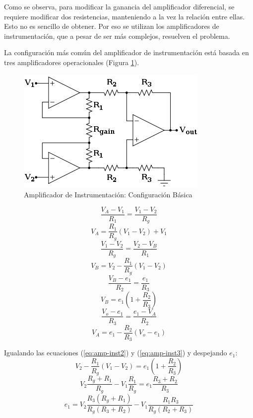 Como se observa, para modificar la ganancia del amplificador diferencial, se requiere modificar dos resistencias, manteniendo a la vez la relación entre ellas. Esto no es sencillo de obtener. Por eso se utilizan los amplificadores de instrumentación, que a pesar de ser más complejos, resuelven el problema.

La configuración más común del amplificador de instrumentación está basada en tres amplificadores operacionales (Figura \ref{fig:amp-instrumentacion}).

\begin{figure}[H]
    \centering
    \includegraphics[width=0.5\linewidth]{Imagenes/Amplificador de Instrumentacion.png}
    \caption{Amplificador de Instrumentación: Configuración Básica}
    \label{fig:amp-instrumentacion}
\end{figure}

\[\frac{V_A - V_1}{R_1} = \frac{V_1 - V_2}{R_g}\]
\begin{equation}
    V_A = \frac{R_1}{R_g} (V_1 - V_2) + V_1
    \label{eq:amp-inst1}
\end{equation}
\[\frac{V_1 - V_2}{R_g} = \frac{V_2 - V_B}{R_1}\]
\begin{equation}
    V_B = V_2 - \frac{R_1}{R_g} (V_1 - V_2)
    \label{eq:amp-inst2}
\end{equation}
\[\frac{V_B - e_1}{R_2} = \frac{e_1}{R_3}\]
\begin{equation}
    V_B = e_1 \left( 1 + \frac{R_2}{R_3} \right)
    \label{eq:amp-inst3}
\end{equation}
\[\frac{V_o -e_1}{R_3} = \frac{e_1 - V_A}{R_2}\]
\begin{equation}
    V_A = e_1 - \frac{R_2}{R_3}(V_o - e_1)
    \label{eq:amp-inst4}
\end{equation}

Igualando las ecuaciones (\ref{eq:amp-inst2}{}) y (\ref{eq:amp-inst3}) y despejando $e_1$:
\[V_2 - \frac{R_1}{R_g} (V_1 - V_2) = e_1 \left( 1 + \frac{R_2}{R_3}\right)\]
\[V_2 \frac{R_g + R_1}{R_g} - V_1 \frac{R_1}{R_g} = e_1 \frac{R_3 + R_2}{R_3}\]
\begin{equation}
    e_1 = V_2 \frac{R_3 (R_g + R_1)}{R_g (R_3 + R_2)} - V_1 \frac{R_1 R_3}{R_g (R_2 + R_3)}
    \label{eq:amp-inst5}
\end{equation}

